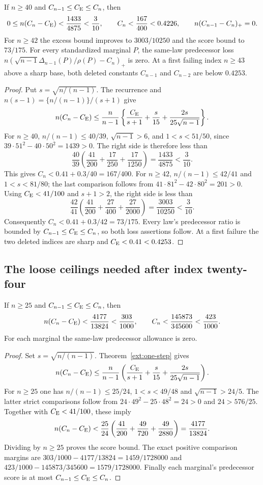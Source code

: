 \begin{corollary}
\label{ext:first-failure-entry}
If $n\ge40$ and $C_{n-1}\le C_{\mathrm E}\le C_n$, then
\[
 0\le n(C_n-C_{\mathrm E})<\frac{1433}{4875}<\frac3{10},
 \qquad C_n<\frac{167}{400}<0.4226,
 \qquad n(C_{n-1}-C_n)_+=0.
\]
For $n\ge42$ the excess bound improves to $3003/10250$ and
the score bound to $73/175$.
For every standardized marginal $P$, the same-law predecessor loss
$n(\sqrt{n-1}\Delta_{n-1}(P)/\rho(P)-C_n)_+$ is zero.
At a first failing index $n\ge43$ above a sharp base, both deleted
constants $C_{n-1}$ and $C_{n-2}$ are below $0.4253$.
\end{corollary}
\begin{proof}
Put $s=\sqrt{n/(n-1)}$. The recurrence and
$n(s-1)=\{n/(n-1)\}/(s+1)$ give
\[
 n(C_n-C_{\mathrm E})\le\frac n{n-1}
 \left\{\frac{C_{\mathrm E}}{s+1}+\frac{s}{15}
                  +\frac{2s}{25\sqrt{n-1}}\right\}.
\]
For $n\ge40$, $n/(n-1)\le40/39$, $\sqrt{n-1}>6$, and
$1<s<51/50$, since $39\cdot51^2-40\cdot50^2=1439>0$.
The right side is therefore less than
\[
 \frac{40}{39}\left(\frac{41}{200}
                  +\frac{17}{250}+\frac{17}{1250}\right)
 =\frac{1433}{4875}<\frac3{10}.
\]
This gives $C_n<0.41+0.3/40=167/400$.
For $n\ge42$, $n/(n-1)\le42/41$ and
$1<s<81/80$; the last comparison follows from
$41\cdot81^2-42\cdot80^2=201>0$.
Using $C_{\mathrm E}<41/100$ and $s+1>2$, the right side is less than
\[
 \frac{42}{41}\left(\frac{41}{200}
                    +\frac{27}{400}+\frac{27}{2000}\right)
 =\frac{3003}{10250}<\frac3{10}.
\]
Consequently $C_n<0.41+0.3/42=73/175$.
Every law's predecessor ratio is bounded by $C_{n-1}\le C_{\mathrm E}\le C_n$,
so both loss assertions follow. At a first failure the two deleted
indices are sharp and $C_{\mathrm E}<0.41<0.4253$.
\end{proof}

\subsection{The loose ceilings needed after index twenty-four}
\label{ext:finite-loose-ceilings}
\begin{lemma}\label{ext:first-failure25}
If $n\ge25$ and $C_{n-1}\le C_{\mathrm E}\le C_n$, then
\[
 n(C_n-C_{\mathrm E})<\frac{4177}{13824}<\frac{303}{1000},
 \qquad C_n<\frac{145873}{345600}<\frac{423}{1000}.
\]
For each marginal the same-law predecessor allowance is zero.
\end{lemma}
\begin{proof}
Set $s=\sqrt{n/(n-1)}$. Theorem~\ref{ext:one-step} gives
\[
 n(C_n-C_{\mathrm E})\le\frac{n}{n-1}
 \left(\frac{C_{\mathrm E}}{s+1}+\frac{s}{15}
                       +\frac{2s}{25\sqrt{n-1}}\right).
\]
For $n\ge25$ one has $n/(n-1)\le25/24$,
$1<s<49/48$ and $\sqrt{n-1}>24/5$.
The latter strict comparisons follow from
$24\cdot49^2-25\cdot48^2=24>0$ and $24>576/25$.
Together with $C_{\mathrm E}<41/100$, these imply
\[
 n(C_n-C_{\mathrm E})<\frac{25}{24}
  \left(\frac{41}{200}+\frac{49}{720}+\frac{49}{2880}\right)
 =\frac{4177}{13824}.
\]
Dividing by $n\ge25$ proves the score bound. The exact positive
comparison margins are
$303/1000-4177/13824=1459/1728000$ and
$423/1000-145873/345600=1579/1728000$.
Finally each marginal's predecessor score is at most $C_{n-1}\le C_{\mathrm E}\le C_n$.
\end{proof}

